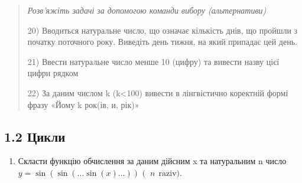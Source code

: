 \documentclass[]{article}
\begin{document}
\begin{quote}
\emph{Розв'яжіть задачі за допомогою команди вибору (альтернативи)}

20) Вводиться натуральне число, що означає кількість днів, що пройшли з
початку поточного року. Виведіть день тижня, на який припадає цей день.

21) Ввести натуральне число менше 10 (цифру) та вивести назву цієї цифри
рядком

22) За даним числом k (k\textless{}100) вивести в лінгвістично коректній
формі фразу «Йому k рок(ів, и, рік)»
\end{quote}

\subsection{1.2 Цикли}\label{ux446ux438ux43aux43bux438}

\begin{enumerate}
\def\labelenumi{\arabic{enumi})}
\item
  Скласти функцію обчислення за даним дійсним x та натуральним n число
  \(y = \sin(\sin(\ldots\sin(x)\ldots))\) \((\)
  \(\mathrm{\ }n\mathrm{\ \ raziv}).\)
\end{enumerate}
\end{document}
